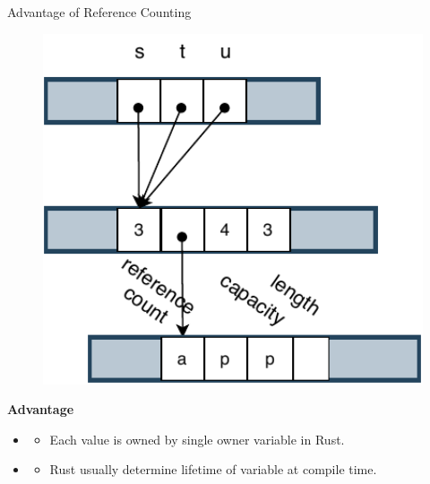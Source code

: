 \documentclass[9pt]{beamer}
\begin{document}
\begin{frame}[t, fragile]{Advantage of Reference Counting}
\begin{minipage}{0.3\linewidth}
\begin{figure}[hp]
        \end{figure}
    \end{minipage}
    \begin{minipage}{0.3\linewidth}
        \begin{figure}[hp]
            \centering
            \begin{center}
                    \includegraphics[width=1.0\textwidth]{images/rc3.pdf}
                    \captionsetup{labelformat=empty}
            \end{center}
            
        \end{figure}
    \end{minipage}
    \vspace{0.5cm}

    \textbf{Advantage}
    \begin{itemize}
        \item {} 
        \begin{itemize}
            \item Each value is owned by single owner variable in Rust.
        \end{itemize}
        \item {}
        \begin{itemize}
            \item Rust usually determine lifetime of variable at compile time. 
        \end{itemize}
    \end{itemize}
\end{frame}
\end{document}
